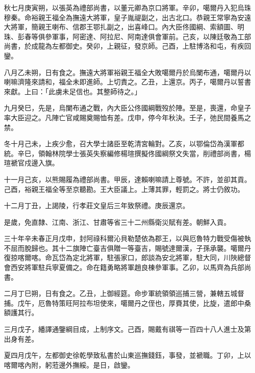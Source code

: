 \begin{pinyinscope}
秋七月庚寅朔，以張英為禮部尚書，以董元卿為京口將軍。辛卯，噶爾丹入犯烏珠穆秦。命裕親王福全為撫遠大將軍，皇子胤禔副之，出古北口。恭親王常寧為安遠大將軍，簡親王喇布、信郡王鄂扎副之，出喜峰口。內大臣佟國綱、索額圖、明珠、彭春等俱參軍事，阿密達、阿拉尼、阿南達俱會軍前。己亥，以陳廷敬為工部尚書，於成龍為左都御史。癸卯，上親征，發京師。己酉，上駐博洛和屯，有疾回鑾。

八月乙未朔，日有食之。撫遠大將軍裕親王福全大敗噶爾丹於烏闌布通，噶爾丹以喇嘛濟隆來請和，福全未即進師。上切責之。乙丑，上還京。丙子，噶爾丹以誓書來獻。上曰：「此虜未足信也。其整師待之。」

九月癸巳，先是，烏闌布通之戰，內大臣公佟國綱戰歿於陣。至是，喪還，命皇子率大臣迎之。凡陣亡官咸賜奠賜恤有差。戊申，停今年秋決。壬子，弛民間養馬之禁。

冬十月己未，上疾少愈，召大學士諸臣至乾清宮輪對。乙亥，以鄂倫岱為漢軍都統。辛巳，領翰林院學士張英失察編修楊瑄撰擬佟國綱祭文失當，削禮部尚書，楊瑄褫官戍邊入旗。

十一月己亥，以熊賜履為禮部尚書。甲辰，達賴喇嘛請上尊號。不許，並卻其貢。己酉，裕親王福全等至京聽勘。王大臣議上。上薄其罪，輕罰之。將士仍敘功。

十二月丁丑，上謁陵，行孝莊文皇后三年致祭禮。庚辰還京。

是歲，免直隸、江南、浙江、甘肅等省三十二州縣衛災賦有差。朝鮮入貢。

三十年辛未春正月戊申，封阿祿科爾沁貝勒楚依為郡王，以與厄魯特力戰受傷被執不屈而脫歸也。其十二旗陣亡臺吉俱贈一等臺吉，賜號達爾漢，子孫承襲。噶爾丹復掠喀爾喀。命瓦岱為定北將軍，駐張家口，郎談為安北將軍，駐大同，川陜總督會西安將軍駐兵寧夏備之。命在籍勇略將軍趙良棟參軍事。乙卯，以馬齊為兵部尚書。

二月丁巳朔，日有食之。乙丑，上御經筵。命步軍統領領巡捕三營，兼轄五城督捕。戊午，厄魯特策旺阿拉布坦使來，噶爾丹之侄也，厚賚其使，比旋，遣郎中桑額護其行。

三月戊子，繙譯通鑒綱目成，上制序文。己酉，賜戴有祺等一百四十八人進士及第出身有差。

夏四月戊午，左都御史徐乾學致私書於山東巡撫錢鈺，事發，並褫職。丁卯，上以喀爾喀內附，躬蒞邊外撫綏。是日，啟鑾。


\end{pinyinscope}
